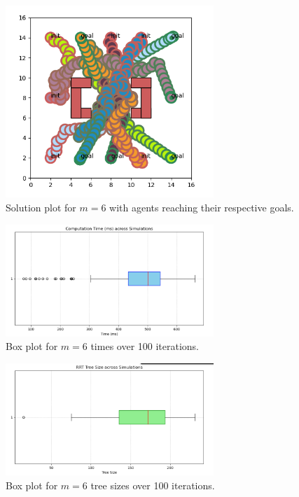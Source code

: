 \documentclass{article}
\begin{document}
\begin{figure}[H]
    \centering
    \includegraphics[width=0.7\textwidth]{1b6plot.png} 
    \caption{Solution plot for \(m = 6\) with agents reaching their respective goals.}
    \label{fig:1b6plot}
\end{figure}

\begin{figure}[H]
    \centering
    \includegraphics[width=0.7\textwidth]{1c6time.png} 
    \caption{Box plot for \(m = 6\) times over 100 iterations.}
    \label{fig:ic6time}
\end{figure}

\begin{figure}[H]
    \centering
    \includegraphics[width=0.7\textwidth]{1c6size.png} 
    \caption{Box plot for \(m = 6\) tree sizes over 100 iterations.}
    \label{fig:ic6size}
\end{figure}
\end{document}
